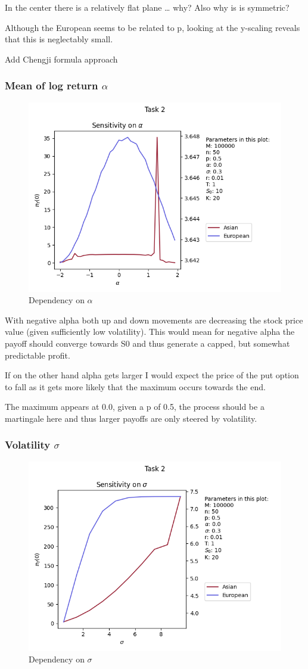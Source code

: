 In the center there is a relatively flat plane … why? Also why is is symmetric? 

Although the European seems to be related to p, looking at the y-scaling reveals that this is  neglectably small.

Add Chengji formula approach

\newpage
\subsubsection{Mean of log return $\alpha$}
\begin{figure}[!h]
    \centering
    \includegraphics[width=0.7\linewidth]{pictures/task2_alpha.png}
    \caption{Dependency on $\alpha$}
    \label{fig:task2_alpha}
\end{figure}

With negative alpha both up and down movements are decreasing the stock price value (given sufficiently low volatility). This would mean for negative alpha the payoff should converge towards S0 and thus generate a capped, but somewhat predictable profit. 

If on the other hand alpha gets larger I would expect the price of the put option to fall as it gets more likely that the maximum occurs towards the end.

The maximum appears at 0.0, given a p of 0.5, the process should be a martingale here and thus larger payoffs are only steered by volatility. 

\newpage
\subsubsection{Volatility $\sigma$}
\begin{figure}[!h]
    \centering
    \includegraphics[width=0.7\linewidth]{pictures/task2_sigma.png}
    \caption{Dependency on $\sigma$}
    \label{fig:task2_sigma}
\end{figure}

